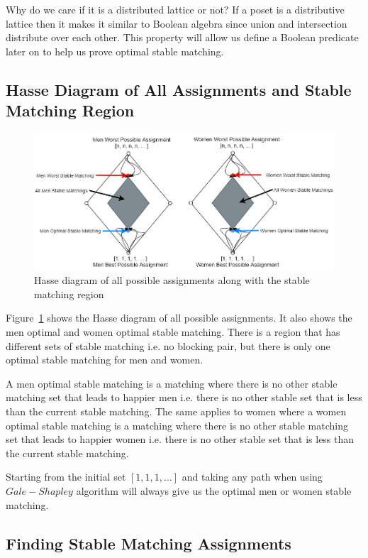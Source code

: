 \documentclass[twoside]{article}
\begin{document}
Why do we care if it is a distributed lattice or not? If a poset is a distributive lattice then it makes it similar to Boolean algebra since union and intersection distribute over each other. This property will allow us define a Boolean predicate later on to help us prove optimal stable matching.

\subsection{Hasse Diagram of All Assignments and Stable Matching Region}

\begin{figure}[htp]
\centering
\includegraphics[width=13cm]{Hasse_Diagram_All_Possible_Stable_Matching.JPG}
\caption{Hasse diagram of all possible assignments along with the stable matching region}
\label{fig:allPossibleStableMatchings}
\end{figure}

Figure~\ref{fig:allPossibleStableMatchings} shows the Hasse diagram of all possible assignments. It also shows the men optimal and women optimal stable matching. There is a region that has different sets of stable matching i.e. no blocking pair, but there is only one optimal stable matching for men and women. 

A men optimal stable matching is a matching where there is no other stable matching set that leads to happier men i.e. there is no other stable set that is less than the current stable matching. The same applies to women where a women optimal stable matching is a matching where there is no other stable matching set that leads to happier women i.e. there is no other stable set that is less than the current stable matching.

Starting from the initial set $[1, 1, 1, \ldots]$ and taking any path when using $Gale-Shapley$ algorithm will always give us the optimal men or women stable matching.

\subsection{Finding Stable Matching Assignments}
\end{document}
